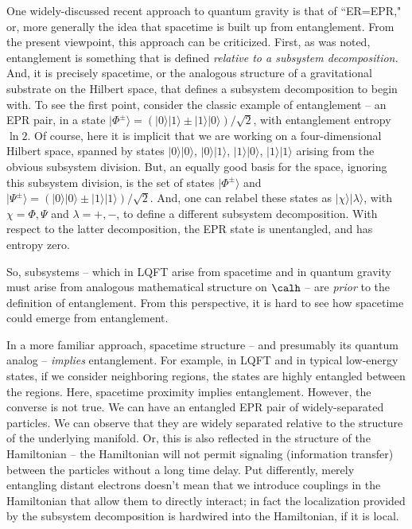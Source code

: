 One widely-discussed recent approach to quantum gravity is that of ``ER=EPR," or, more generally the idea that spacetime is built up from entanglement.  From the present viewpoint, this approach can be criticized.  First, as was noted, entanglement is something that is defined {\it relative to a subsystem decomposition.}  And, it is precisely spacetime, or the analogous structure of a gravitational substrate on the Hilbert space, that defines a subsystem decomposition to begin with. To see the first point, consider the classic example of entanglement -- an EPR pair, in a state $|\Phi^\pm\rangle = (|0\rangle |1\rangle \pm |1\rangle|0\rangle)/\sqrt 2$, with entanglement entropy $\ln 2$.  Of course, here it is implicit that we are working on a four-dimensional Hilbert space, spanned by states $|0\rangle|0\rangle$, $|0\rangle |1\rangle$, $|1\rangle|0\rangle$, $|1\rangle|1\rangle$ arising from the obvious subsystem division.  But, an equally good basis for the space, ignoring this subsystem division, is the set of states $|\Phi^\pm\rangle$ and $|\Psi^\pm\rangle = (|0\rangle |0\rangle \pm |1\rangle|1\rangle)/\sqrt 2$.  And, one can relabel these states as $|\chi\rangle |\lambda\rangle$, with $\chi=\Phi,\Psi$ and $\lambda=+,-$, to define a different subsystem decomposition.  With respect to the latter decomposition, the EPR state is unentangled, and has entropy zero.

So, subsystems -- which in LQFT arise from spacetime and in quantum gravity must arise from analogous mathematical structure on $\calh$ -- are {\it prior} to the definition of entanglement.  From this perspective, it is hard to see how spacetime could emerge from entanglement.  

In a more familiar approach,  spacetime structure -- and presumably its quantum analog -- {\it implies} entanglement.  For example, in LQFT and in typical low-energy states, if we consider neighboring regions, the states are highly entangled between the regions.  Here, spacetime proximity implies entanglement.  However, the converse is not true.  We can have an entangled EPR pair of widely-separated particles.  We can observe that they are widely separated relative to the structure of the underlying manifold.  Or, this is also reflected in the structure of the Hamiltonian -- the Hamiltonian will not permit signaling (information transfer) between the particles without a long time delay.  Put differently, merely entangling distant electrons doesn't mean that we introduce couplings in the Hamiltonian that allow them to directly interact; in fact the localization provided by the subsystem decomposition is hardwired into the Hamiltonian, if it is local.

